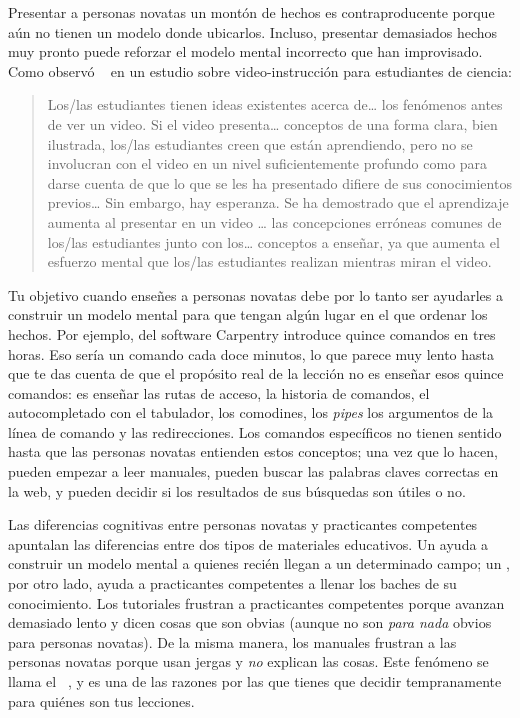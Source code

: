 Presentar a personas novatas un montón de hechos es contraproducente
porque aún no tienen un modelo donde ubicarlos.
Incluso,
presentar demasiados hechos muy pronto puede reforzar
el modelo mental incorrecto que han improvisado.
Como observó ~\cite{Mull2007a} en un estudio sobre video-instrucción para estudiantes de ciencia:

\begin{quote}
Los/las estudiantes tienen ideas existentes acerca de{\ldots} los fenómenos antes de ver un video. Si el video presenta{\ldots} conceptos de una forma clara, bien ilustrada, los/las estudiantes creen que están aprendiendo, pero no se involucran con el video en un nivel suficientemente profundo como para darse cuenta de que lo que se les ha presentado difiere de sus conocimientos previos{\ldots} Sin embargo, hay esperanza. Se ha demostrado que el aprendizaje aumenta al presentar en un video {\ldots} las concepciones erróneas comunes de los/las estudiantes junto con los{\ldots} conceptos a enseñar, ya que aumenta el esfuerzo mental que los/las estudiantes realizan mientras miran el video. 
\end{quote}

Tu objetivo cuando enseñes a personas novatas debe por lo tanto ser
ayudarles a construir un modelo mental
para que tengan algún lugar en el que ordenar los hechos.
Por ejemplo,
 del software Carpentry
introduce quince comandos en tres horas.
Eso sería un comando cada doce minutos,
lo que parece muy lento hasta que te das cuenta de que
el propósito real de la lección no es enseñar esos quince comandos:
es enseñar las rutas de acceso,
la historia de comandos,
el autocompletado con el tabulador,
los comodines,
los \emph{pipes}
los argumentos de la línea de comando
y las redirecciones.
Los comandos específicos no tienen sentido hasta que las personas novatas entienden estos conceptos;
una vez que lo hacen,
pueden empezar a leer manuales,
pueden buscar las palabras claves correctas en la web,
y pueden decidir si los resultados de sus búsquedas son útiles o no.

Las diferencias cognitivas entre personas novatas y practicantes competentes
apuntalan las diferencias entre dos tipos de materiales educativos.
Un  ayuda a construir un modelo mental a quienes recién llegan a un determinado campo;
un ,
por otro lado,
ayuda a practicantes competentes a llenar los baches de su conocimiento.
Los tutoriales frustran a practicantes competentes porque avanzan demasiado lento
y dicen cosas que son obvias
(aunque no son \emph{para nada} obvios para personas novatas).
De la misma manera,
los manuales frustran a las personas novatas porque usan jergas y \emph{no} explican las cosas.
Este fenómeno se llama el  ~\cite{Kaly2003},
y es una de las razones por las que tienes que decidir tempranamente para quiénes son tus lecciones. 

